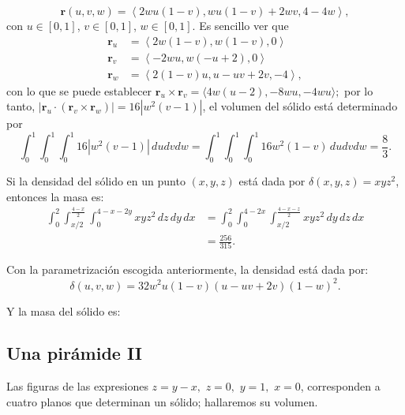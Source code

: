 \[ \mathbf{r}(u,v,w) = \left\langle 2wu(1-v), wu(1-v)+2wv, 4-4w \right\rangle\!, \]
con $u \in [0,1]$, $v \in [0,1]$, $w \in [0,1]$. Es sencillo ver que
\begin{align*}
  \mathbf{r}_u &= \left\langle 2w(1-v), w(1-v), 0 \right\rangle \\
  \mathbf{r}_v &= \left\langle -2wu, w(-u+2), 0 \right\rangle \\
  \mathbf{r}_w &= \left\langle 2(1-v)u, u-uv+2v, -4 \right\rangle\!,
\end{align*}
con lo que se puede establecer $\mathbf{r}_u \times \mathbf{r}_v = \langle 4w(u-2), -8wu, -4wu \rangle;$ por lo tanto, $|\mathbf{r}_u \cdot (\mathbf{r}_v \times \mathbf{r}_w)| = 16|w^2(v-1)|$, el volumen del sólido está determinado por
\[ \int_{0}^{1}\int_{0}^{1}\int_{0}^{1} 16|w^2(v-1)|\, dudvdw = \int_{0}^{1}\int_{0}^{1}\int_{0}^{1} 16w^2(1-v)\, dudvdw = \frac{8}{3}. \]

Si la densidad del sólido en un punto $(x,y,z)$ está dada por $\delta(x,y,z) = xyz^{2}$, entonces la masa es:
\begin{align*}
  \int_{0}^{2} \int_{x/2}^{\frac{4-x}{2}} \int_{0}^{4 - x - 2y} xyz^{2} \, dz \, dy \, dx
  &= \int_{0}^{2} \int_{0}^{4 - 2x} \int_{x/2}^{\frac{4 - x - z}{2}} xyz^{2} \, dy \, dz \, dx \\
  &= \frac{256}{315}.
\end{align*}

Con la parametrización escogida anteriormente, la densidad está dada por:
\[
  \delta(u,v,w) = 32w^{2}u(1-v)(u - uv + 2v)(1 - w)^{2}.
\]

Y la masa del sólido es:
\begin{center} %
\end{center}
\subsection{Una pirámide II}
Las figuras de las expresiones $z=y-x,\,\, z=0,\,\, y=1, \,\, x=0$,
corresponden a cuatro planos que determinan un sólido; hallaremos su volumen.

